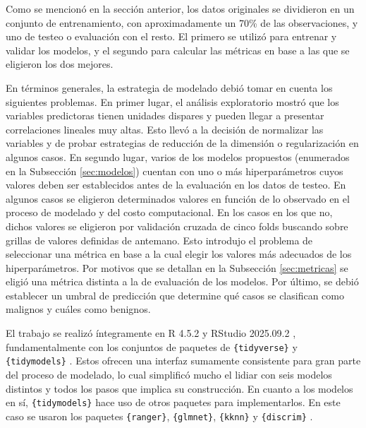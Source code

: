 %

Como se mencionó en la sección anterior, los datos originales se dividieron en
un conjunto de entrenamiento, con aproximadamente un 70\% de las observaciones,
y uno de testeo o evaluación con el resto. El primero se utilizó para entrenar
y validar los modelos, y el segundo para calcular las métricas en base a las
que se eligieron los dos mejores.

En términos generales, la estrategia de modelado debió tomar en cuenta los
siguientes problemas. En primer lugar, el análisis exploratorio mostró que los
variables predictoras tienen unidades dispares y pueden llegar a presentar
correlaciones lineales muy altas. Esto llevó a la decisión de normalizar las
variables y de probar estrategias de reducción de la dimensión o regularización
en algunos casos. En segundo lugar, varios de los modelos propuestos
(enumerados en la Subsección \ref{sec:modelos}) cuentan con uno o más
hiperparámetros cuyos valores deben ser establecidos antes de la evaluación en
los datos de testeo. En algunos casos se eligieron determinados valores en
función de lo observado en el proceso de modelado y del costo computacional. En
los casos en los que no, dichos valores se eligieron por validación cruzada de
cinco folds buscando sobre grillas de valores definidas de antemano. Esto
introdujo el problema de seleccionar una métrica en base a la cual elegir los
valores más adecuados de los hiperparámetros. Por motivos que se detallan en la
Subsección \ref{sec:metricas} se eligió una métrica distinta a la de evaluación
de los modelos. Por último, se debió establecer un umbral de predicción que
determine qué casos se clasifican como malignos y cuáles como benignos.

El trabajo se realizó íntegramente en R 4.5.2 y RStudio 2025.09.2
\parencite{rcoreteam_2025_language,positteam_2025_rstudio}, fundamentalmente
con los conjuntos de paquetes de \verb|{tidyverse}| y \verb|{tidymodels}|
\parencite{wickham_etal_2019_welcome,kuhn_wickham_2020_tidymodels}. Estos
ofrecen una interfaz sumamente consistente para gran parte del proceso de
modelado, lo cual simplificó mucho el lidiar con seis modelos distintos y todos
los pasos que implica su construcción. En cuanto a los modelos en sí,
\verb|{tidymodels}| hace uso de otros paquetes para implementarlos. En este
caso se usaron los paquetes \verb|{ranger}|, \verb|{glmnet}|, \verb|{kknn}| y
\verb|{discrim}|
\parencite{wright_ziegler_2017_ranger,friedman_etal_2010_regularization,tay_etal_2023_elastic,schliep_hechenbichler_2025_kknn}.

